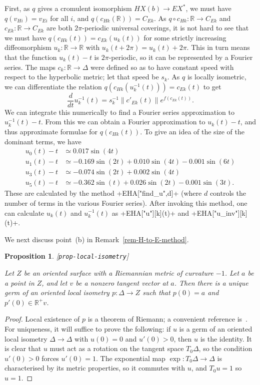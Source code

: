 \documentclass[reqno]{amsart}
\newcommand{\lbl}[1]{\label{#1}\textup{[\texttt{#1}]}\par}
\newcommand{\lbl}{\label}
\newcommand{\Dl}        {\Delta}
\newcommand{\R}         {{\mathbb{R}}}
\renewcommand{\:}{\colon}
\newtheorem{proposition}[theorem]{Proposition}
\theoremstyle{definition}
\begin{document}
First, as $q$ gives a cromulent isomorphism $HX(b)\to EX^*$, we must
have $q(v_{Hi})=v_{Ei}$ for all $i$, and $q(c_{Hk}(\R))=C_{Ek}$.  As
$q\circ c_{Hk}\:\R\to C_{Ek}$ and $c_{Ek}\:\R\to C_{Ek}$ are both
$2\pi$-periodic universal coverings, it is not hard to see
that we must have $q(c_{Hk}(t))=c_{Ek}(u_k(t))$ for some strictly
increasing diffeomorphism $u_k\:\R\to\R$ with
$u_k(t+2\pi)=u_k(t)+2\pi$.  This in turn means that the function
$u_k(t)-t$ is $2\pi$-periodic, so it can be represented by a
Fourier series.  The maps $c_k\:\R\to\Dl$ were defined so as to have
constant speed with respect to the hyperbolic metric; let that speed
be $s_k$.  As $q$ is locally isometric, we can differentiate the
relation $q(c_{Hk}(u_k^{-1}(t)))=c_{Ek}(t)$ to get
\[ \frac{d}{dt}u_k^{-1}(t) =
     s_k^{-1}\|c'_{Ek}(t)\|e^{f(c_{Ek}(t))}.
\]
We can integrate this numerically to find a Fourier series
approximation to $u_k^{-1}(t)-t$.  From this we can obtain a Fourier
approximation to $u_k(t)-t$, and thus approximate formulae for
$q(c_{Hk}(t))$.  To give an idea of the size of the dominant terms, we
have
\begin{align*}
 u_0(t) - t &\simeq  0.017 \sin(4t) \\
 u_1(t) - t &\simeq -0.169 \sin(2t) + 0.010 \sin(4t) - 0.001 \sin(6t) \\
 u_3(t) - t &\simeq -0.074 \sin(2t) + 0.002 \sin(4t) \\
 u_5(t) - t &\simeq -0.362 \sin(t) + 0.026\sin(2t) - 0.001\sin(3t).
\end{align*}
These are calculated by the method \mcode+EHA["find_u",d]+ (where $d$
controls the number of terms in the various Fourier series).  After
invoking this method, one can calculate $u_k(t)$ and $u_k^{-1}(t)$ as
\mcode+EHA["u"][k](t)+ and \mcode+EHA["u_inv"][k](t)+.

We next discuss point~(b) in Remark~\ref{rem-H-to-E-method}.

\begin{proposition}\lbl{prop-local-isometry}
 Let $Z$ be an oriented surface with a Riemannian metric of curvature
 $-1$.  Let $a$ be a point in $Z$, and let $v$ be a nonzero tangent
 vector at $a$.  Then there is a unique germ of an oriented local
 isometry $p\:\Dl\to Z$ such that $p(0)=a$ and $p'(0)\in\R^+v$.
\end{proposition}
\begin{proof}
 Local existence of $p$ is a theorem of Riemann; a convenient
 reference is~\cite[Theorem 2.4.11]{wo:scc}.  For uniqueness, it will
 suffice to prove the following: if $u$ is a germ of an oriented local
 isometry $\Dl\to\Dl$ with $u(0)=0$ and $u'(0)>0$, then $u$ is the
 identity.  It is clear that $u$ must act as a rotation on the tangent
 space $T_0\Dl$, so the condition $u'(0)>0$ forces $u'(0)=1$.  The
 exponential map $\exp\:T_0\Dl\to\Dl$ is characterised by its metric
 properties, so it commutes with $u$, and $T_0u=1$ so $u=1$.
\end{proof}
\end{document}
